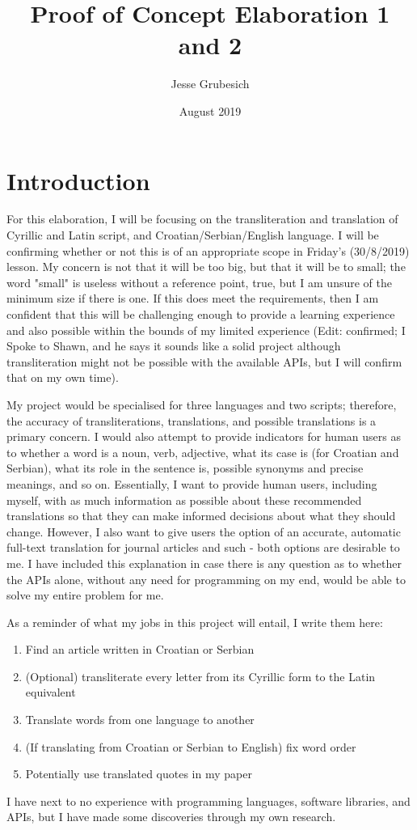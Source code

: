 \documentclass{article}
\title{Proof of Concept Elaboration 1 and 2}
\author{Jesse Grubesich}
\date{August 2019}
\begin{document}
\maketitle
\tableofcontents
\newpage
\section{Introduction}
For this elaboration, I will be focusing on the transliteration and translation of Cyrillic and Latin script, and Croatian/Serbian/English language. I will be confirming whether or not this is of an appropriate scope in Friday's (30/8/2019) lesson. My concern is not that it will be too big, but that it will be to small; the word "small" is useless without a reference point, true, but I am unsure of the minimum size if there is one. If this does meet the requirements, then I am confident that this will be challenging enough to provide a learning experience and also possible within the bounds of my limited experience (Edit: confirmed; I Spoke to Shawn, and he says it sounds like a solid project although transliteration might not be possible with the available APIs, but I will confirm that on my own time).

My project would be specialised for three languages and two scripts; therefore, the accuracy of transliterations, translations, and possible translations is a primary concern. I would also attempt to provide indicators for human users as to whether a word is a noun, verb, adjective, what its case is (for Croatian and Serbian), what its role in the sentence is, possible synonyms and precise meanings, and so on. Essentially, I want to provide human users, including myself, with as much information as possible about these recommended translations so that they can make informed decisions about what they should change. However, I also want to give users the option of an accurate, automatic full-text translation for journal articles and such - both options are desirable to me. I have included this explanation in case there is any question as to whether the APIs alone, without any need for programming on my end, would be able to solve my entire problem for me.

As a reminder of what my jobs in this project will entail, I write them here:
\begin{enumerate}
\item Find an article written in Croatian or Serbian
\item (Optional) transliterate every letter from its Cyrillic form to the Latin equivalent
\item Translate words from one language to another
\item (If translating from Croatian or Serbian to English) fix word order
\item Potentially use translated quotes in my paper
\end{enumerate}
I have next to no experience with programming languages, software libraries, and APIs, but I have made some discoveries through my own research.
\end{document}
